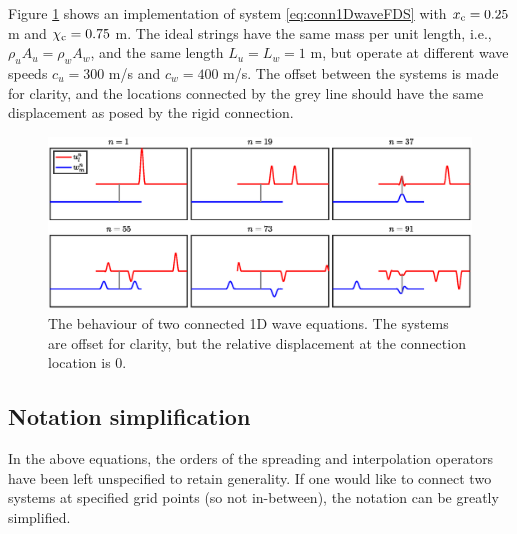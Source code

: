 Figure \ref{fig:connectedWaveEqs} shows an implementation of system \eqref{eq:conn1DwaveFDS} with $x_{\text{c}} = 0.25$ m and $\chi_{\text{c}} = 0.75$ m. The ideal strings have the same mass per unit length, i.e., $\rho_uA_u = \rho_wA_w$, and the same length $L_u=L_w = 1$ m, but operate at different wave speeds $c_u=300$ m/s and $c_w=400$ m/s. The offset between the systems is made for clarity, and the locations connected by the grey line should have the same displacement as posed by the rigid connection. 

\begin{figure}[h]
    \includegraphics[width=\textwidth]{figures/interactions/connectedWaveEqs.eps}
    \caption{The behaviour of two connected 1D wave equations. The systems are offset for clarity, but the relative displacement at the connection location is 0. \label{fig:connectedWaveEqs}}
\end{figure}

\subsection{Notation simplification}\label{sec:notationSimplification}
In the above equations, the orders of the spreading and interpolation operators have been left unspecified to retain generality. If one would like to connect two systems at specified grid points (so not in-between), the notation can be greatly simplified.%

